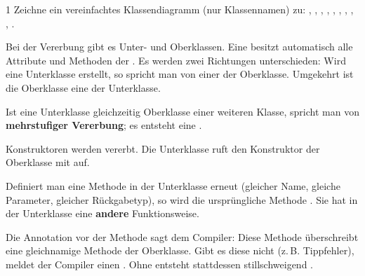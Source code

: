 \documentclass[11pt,a4paper]{article}
\begin{document}
\begin{aufgabe}{1}
\RaggedRight Zeichne ein vereinfachtes Klassendiagramm (nur Klassennamen) zu: , , , , , , , , , .
\end{aufgabe}

\begin{merke}\lueckentext
Bei der Vererbung gibt es Unter- und Oberklassen. Eine  besitzt automatisch alle Attribute und Methoden der . Es werden zwei Richtungen unterschieden: Wird eine Unterklasse erstellt, so spricht man von einer  der Oberklasse. Umgekehrt ist die Oberklasse eine  der Unterklasse.

Ist eine Unterklasse gleichzeitig Oberklasse einer weiteren Klasse, spricht man von \textbf{mehrstufiger Vererbung}; es entsteht eine .
\end{merke}

\newpage
\begin{merke}\lueckentext
Konstruktoren werden  vererbt. Die Unterklasse ruft den Konstruktor der Oberklasse mit  auf.

Definiert man eine Methode in der Unterklasse erneut (gleicher Name, gleiche Parameter, gleicher Rückgabetyp), so wird die ursprüngliche Methode . Sie hat in der Unterklasse eine \textbf{andere} Funktionsweise.

Die Annotation  vor der Methode sagt dem Compiler: Diese Methode überschreibt eine gleichnamige Methode der Oberklasse. Gibt es diese nicht (z.\,B. Tippfehler), meldet der Compiler einen . Ohne  entsteht stattdessen stillschweigend .
\end{merke}
\end{document}
